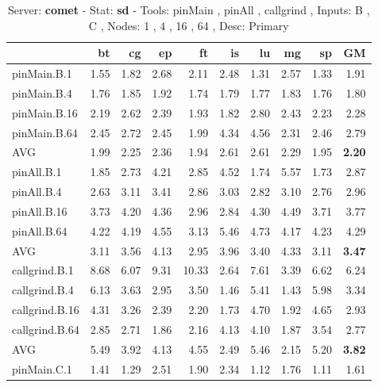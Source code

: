 \iffalse

\begin{table*}[]
\caption{Server: \textbf{comet} - 
 Stat: \textbf{sd} - 
 Tools: pinMain , pinAll , callgrind ,  
 Inputs: B , C ,  
 Nodes: 1 , 4 , 16 , 64 ,  
 Desc: Primary}
\label{comet_sd_pMpAcg_BC_itn_p3.5}\begin{center}
\begin{tabular}{|l|rrrrrrrr|r|}
\hline
                &   bt &   cg &    ep &    ft &   is &   lu &   mg &   sp &   GM \\
\hline
 pinMain.B.1    & 1.55 & 1.82 &  2.68 &  2.11 & 2.48 & 1.31 & 2.57 & 1.33 & 1.91 \\
 pinMain.B.4    & 1.76 & 1.85 &  1.92 &  1.74 & 1.79 & 1.77 & 1.83 & 1.76 & 1.80 \\
 pinMain.B.16   & 2.19 & 2.62 &  2.39 &  1.93 & 1.82 & 2.80 & 2.43 & 2.23 & 2.28 \\
 pinMain.B.64   & 2.45 & 2.72 &  2.45 &  1.99 & 4.34 & 4.56 & 2.31 & 2.46 & 2.79 \\
 \hline
 AVG            & 1.99 & 2.25 &  2.36 &  1.94 & 2.61 & 2.61 & 2.29 & 1.95 & \textbf{2.20} \\
 \hline
 pinAll.B.1     & 1.85 & 2.73 &  4.21 &  2.85 & 4.52 & 1.74 & 5.57 & 1.73 & 2.87 \\
 pinAll.B.4     & 2.63 & 3.11 &  3.41 &  2.86 & 3.03 & 2.82 & 3.10 & 2.76 & 2.96 \\
 pinAll.B.16    & 3.73 & 4.20 &  4.36 &  2.96 & 2.84 & 4.30 & 4.49 & 3.71 & 3.77 \\
 pinAll.B.64    & 4.22 & 4.19 &  4.55 &  3.13 & 5.46 & 4.73 & 4.17 & 4.23 & 4.29 \\
 \hline
 AVG            & 3.11 & 3.56 &  4.13 &  2.95 & 3.96 & 3.40 & 4.33 & 3.11 & \textbf{3.47} \\
 \hline
 callgrind.B.1  & 8.68 & 6.07 &  9.31 & 10.33 & 2.64 & 7.61 & 3.39 & 6.62 & 6.24 \\
 callgrind.B.4  & 6.13 & 3.63 &  2.95 &  3.50 & 1.46 & 5.41 & 1.43 & 5.98 & 3.34 \\
 callgrind.B.16 & 4.31 & 3.26 &  2.39 &  2.20 & 1.73 & 4.70 & 1.92 & 4.65 & 2.93 \\
 callgrind.B.64 & 2.85 & 2.71 &  1.86 &  2.16 & 4.13 & 4.10 & 1.87 & 3.54 & 2.77 \\
 \hline
 AVG            & 5.49 & 3.92 &  4.13 &  4.55 & 2.49 & 5.46 & 2.15 & 5.20 & \textbf{3.82} \\
 \hline
  \hline
 pinMain.C.1    & 1.41 & 1.29 &  2.51 &  1.90 & 2.34 & 1.12 & 1.76 & 1.11 & 1.61 \\

\end{tabular}
\end{center}
\end{table*}
